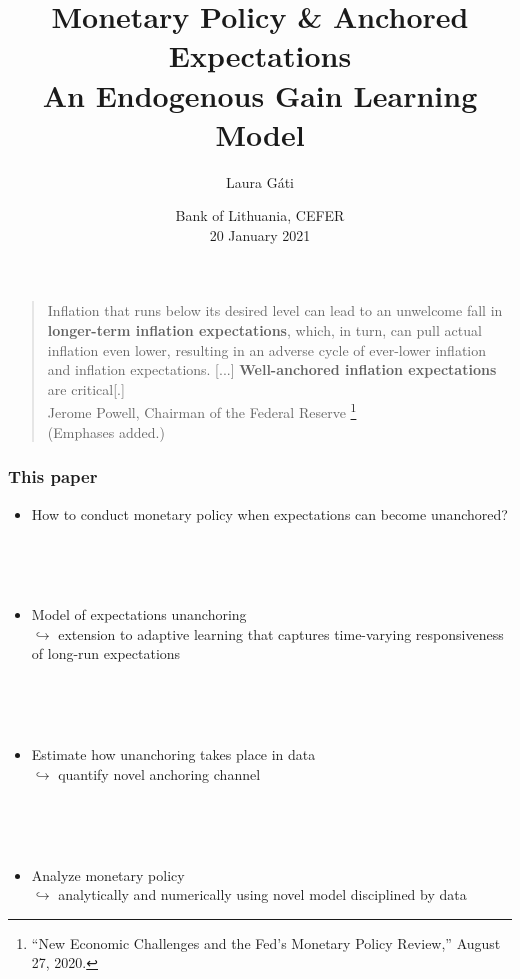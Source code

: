 \documentclass[10pt]{beamer}
\author[]{Laura G\'ati}
\institute[]{Boston College}
\title[]{Monetary Policy \& Anchored Expectations \\
An Endogenous Gain Learning Model}
\date[]{Bank of Lithuania, CEFER \\
\vspace{0.2cm}
20 January 2021}
\begin{document}
\begin{frame}[plain] %

\maketitle

\end{frame}




\begin{frame}\label{motivation}
	
\begin{quote}
Inflation that runs below its desired level can lead to an unwelcome fall in \textbf{longer-term inflation expectations}, which, in turn, can pull actual inflation even lower, resulting in an adverse cycle of ever-lower inflation and inflation expectations.
[...]  \textbf{Well-anchored inflation expectations} are critical[.]  \\
Jerome Powell, Chairman of the Federal Reserve \footnote{``New Economic Challenges and the Fed's Monetary Policy Review,''  August 27, 2020.} \\
(Emphases added.)
\end{quote}	



\end{frame}






\begin{frame}
	\frametitle{This paper}
	
	\begin{itemize}
	\item How to conduct monetary policy when expectations can become unanchored?
	
	\
	
	\

	\item Model of expectations unanchoring  \\
	$\hookrightarrow$ extension to adaptive learning that captures time-varying responsiveness of long-run expectations
	
	
	\
	
	\
	
	\item Estimate how unanchoring takes place in data \\
	$\hookrightarrow$ quantify novel anchoring channel
	
	\
	
	\
	
	\item Analyze monetary policy \\
	$\hookrightarrow$ analytically and numerically using novel model disciplined by data

	\end{itemize}
	\end{frame}
\end{document}
